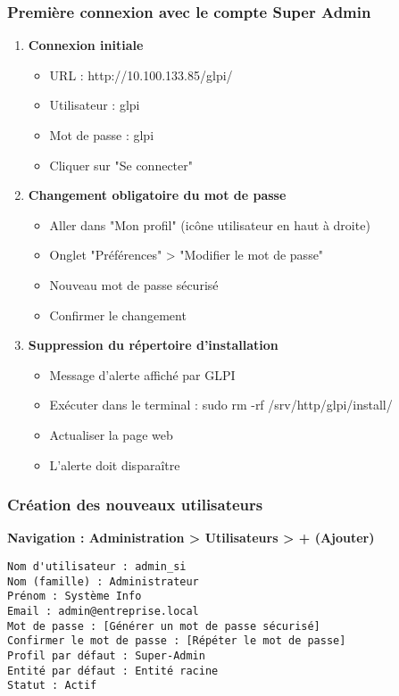 \documentclass[12pt,a4paper]{article}
\begin{document}
\subsubsection{Première connexion avec le compte Super Admin}
\begin{enumerate}
    \item \textbf{Connexion initiale}
    \begin{itemize}
        \item URL : http://10.100.133.85/glpi/
        \item Utilisateur : glpi
        \item Mot de passe : glpi
        \item Cliquer sur "Se connecter"
    \end{itemize}
    
    \item \textbf{Changement obligatoire du mot de passe}
    \begin{itemize}
        \item Aller dans "Mon profil" (icône utilisateur en haut à droite)
        \item Onglet "Préférences" > "Modifier le mot de passe"
        \item Nouveau mot de passe sécurisé
        \item Confirmer le changement
    \end{itemize}
    
    \item \textbf{Suppression du répertoire d'installation}
    \begin{itemize}
        \item Message d'alerte affiché par GLPI
        \item Exécuter dans le terminal : sudo rm -rf /srv/http/glpi/install/
        \item Actualiser la page web
        \item L'alerte doit disparaître
    \end{itemize}
\end{enumerate}

\subsubsection{Création des nouveaux utilisateurs}
\textbf{Navigation : Administration > Utilisateurs > + (Ajouter)}

\begin{lstlisting}[caption=Exemple de création d'utilisateur administrateur]
Nom d'utilisateur : admin_si
Nom (famille) : Administrateur
Prénom : Système Info
Email : admin@entreprise.local
Mot de passe : [Générer un mot de passe sécurisé]
Confirmer le mot de passe : [Répéter le mot de passe]
Profil par défaut : Super-Admin
Entité par défaut : Entité racine
Statut : Actif
\end{lstlisting}
\end{document}
